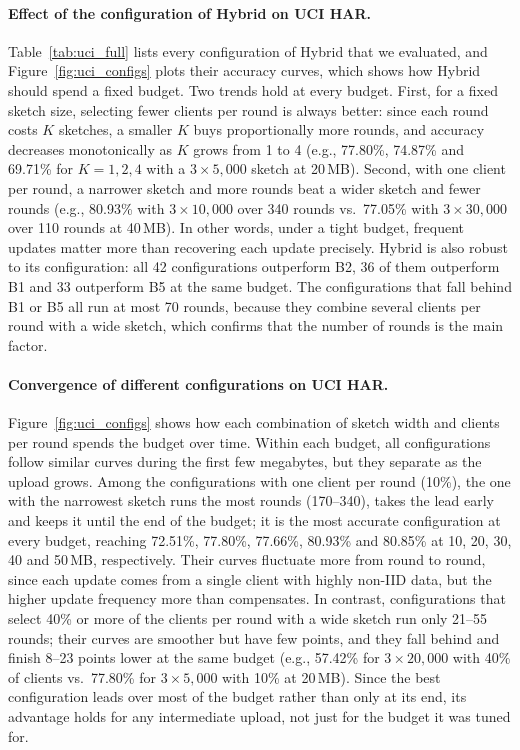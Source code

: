 \documentclass[sigconf]{acmart}
\newcommand{\method}{Hybrid}   %
\begin{document}
\paragraph{Effect of the configuration of \method{} on UCI HAR.}
Table~\ref{tab:uci_full} lists every
configuration of \method{} that we evaluated, and Figure~\ref{fig:uci_configs}
plots their accuracy curves, which shows how \method{} should spend a fixed
budget. Two trends hold at every budget. First, for a fixed sketch size,
selecting fewer clients per round is always better: since each round costs
$K$ sketches, a smaller $K$ buys proportionally more rounds, and accuracy
decreases monotonically as $K$ grows from 1 to 4 (e.g., 77.80\%, 74.87\% and
69.71\% for $K=1,2,4$ with a $3\times5{,}000$ sketch at 20\,MB). Second, with
one client per round, a narrower sketch and more rounds beat a wider sketch and
fewer rounds (e.g., 80.93\% with $3\times10{,}000$ over 340 rounds vs.\ 77.05\%
with $3\times30{,}000$ over 110 rounds at 40\,MB). In other words, under a
tight budget, frequent updates matter more than recovering each update
precisely. \method{} is also robust to its configuration: all 42
configurations outperform B2, 36 of them outperform B1 and 33 outperform B5 at
the same budget. The configurations that fall behind B1 or B5 all run at most
70 rounds, because they combine several clients per round with a wide sketch,
which confirms that the number of rounds is the main factor.

\paragraph{Convergence of different configurations on UCI HAR.}
Figure~\ref{fig:uci_configs} shows how each combination of sketch width and
clients per round spends the budget over time. Within each budget, all
configurations follow similar curves during the first few megabytes, but they
separate as the upload grows. Among the configurations with one client per
round (10\%), the one with the narrowest sketch runs the most rounds (170--340),
takes the lead early and keeps it until the end of the budget; it is the most
accurate configuration at every budget, reaching 72.51\%, 77.80\%, 77.66\%, 80.93\% and
80.85\% at 10, 20, 30, 40 and 50\,MB, respectively. Their curves fluctuate more
from round to round, since each update comes from a single client with highly
non-IID data, but the higher update frequency more than compensates. In
contrast, configurations that select 40\% or more of the clients per round
with a wide sketch run only 21--55 rounds; their curves are smoother but have
few points, and they fall behind and finish 8--23 points lower at the same
budget (e.g., 57.42\% for $3\times20{,}000$ with 40\% of clients vs.\ 77.80\%
for $3\times5{,}000$ with 10\% at 20\,MB). Since the best configuration leads
over most of the budget rather than only at its end, its advantage holds for
any intermediate upload, not just for the budget it was tuned for.
\end{document}
